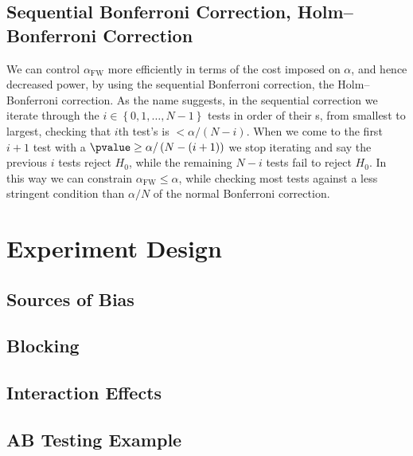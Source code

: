 \subsection{Sequential Bonferroni Correction, \texorpdfstring{\ie}{ie} Holm--Bonferroni Correction}
\label{hypo:bonferroni_correction:sequential}

We can control $\alpha_{\text{FW}}$ more efficiently in terms of the cost imposed on $\alpha$, and hence decreased power,
by using the sequential Bonferroni correction, \ie the Holm--Bonferroni correction.
As the name suggests, in the sequential correction
we iterate through the $i \in \left\{0, 1, \ldots, N-1\right\}$ tests
in order of their {\pvalue}s, from smallest to largest,
checking that $i$th test's \pvalue is $< \alpha / \left(N-i\right)$.
When we come to the first $i+1$ test with a $\pvalue \geq \alpha / \left(N-\left(i+1\right)\right)$
we stop iterating and say the previous $i$ tests reject $H_{0}$,
while the remaining $N-i$ tests fail to reject $H_{0}$.
In this way we can constrain $\alpha_{\text{FW}} \leq \alpha$,
while checking most tests against a less stringent condition
than $\alpha / N$ of the normal Bonferroni correction.

\section{Experiment Design}
\label{hypo:experiment}

\subsection{Sources of Bias}
\label{hypo:experiment:bias}

\subsection{Blocking}
\label{hypo:experiment:blocking}

\subsection{Interaction Effects}
\label{hypo:experiment:interaction}

\subsection{AB Testing Example}
\label{hypo:experiment:AB}
